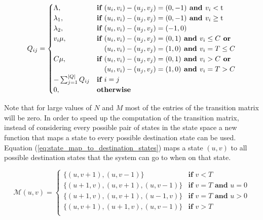 \begin{equation} \label{eq:markov_transition_rate}
    Q_{ij} =
    \begin{cases}
        \Lambda, & \textbf{if } (u_i, v_i) - (u_j, v_j) = (0,-1) \textbf{ and }
        v_i < \text{t} \\
        \lambda_1, & \textbf{if } (u_i, v_i) - (u_j, v_j) = (0,-1)
        \textbf{ and } v_i \geq \text{t} \\
        \lambda_2, & \textbf{if } (u_i, v_i) - (u_j, v_j) = (-1,0) \\
        v_i \mu, & \textbf{if } (u_i, v_i) - (u_j, v_j) = (0,1) \textbf{ and }
        v_i \leq C \textbf{ or} \\ & \hspace{0.37cm}(u_i, v_i) - (u_j, v_j) =
        (1,0) \textbf{ and } v_i = T \leq C \\
        C \mu, & \textbf{if } (u_i, v_i) - (u_j, v_j) = (0,1) \textbf{ and }
        v_i > C
        \textbf{ or} \\ & \hspace{0.37cm}(u_i, v_i) - (u_j, v_j) = (1,0)
        \textbf{ and } v_i = T > C\\
        -\sum_{j=1}^{|Q|}{Q_{ij}} & \textbf{if } i = j \\
        0, & \textbf{otherwise}
    \end{cases}
\end{equation}

Note that for large values of \(N\) and \(M\) most of the entries of the
transition matrix will be zero.
In order to speed up the computation of the transition matrix, instead of
considering every possible pair of states in the state space a new function
that maps a state to every possible destination state can be used.
Equation (\ref{eq:state_map_to_destination_states}) maps a state \((u, v)\)
to all possible destination states that the system can go to when on that state.

\begin{equation}\label{eq:state_map_to_destination_states}
    \mathcal{M}(u, v) = 
    \begin{cases}
        \{(u, v + 1), (u, v - 1)\} & \textbf{if } v < T \\
        \{(u + 1, v), (u, v + 1), (u, v - 1)\} & \textbf{if } v = T 
        \textbf{ and } u = 0 \\
        \{(u + 1, v), (u, v + 1), (u - 1, v)\} & \textbf{if } v = T
        \textbf{ and } u > 0 \\
        \{(u, v + 1), (u + 1, v), (u, v - 1)\} & \textbf{if } v > T \\
    \end{cases}
\end{equation}


